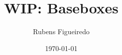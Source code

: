 \documentclass[11pt]{beamer}
\author{Rubens Figueiredo}
\title{WIP: Baseboxes}
\institute{BISDN GmbH}
\date{\today}
\begin{document}
\begin{frame}
\titlepage
\end{frame}

\begin{frame}
\tableofcontents
\end{frame}




\end{document}
